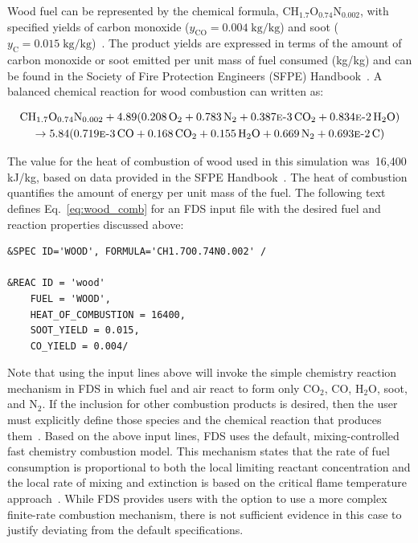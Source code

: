 \documentclass[12pt,oneside]{book}
\renewcommand{\C}{\mbox{C}}
\renewcommand{\H}{\mbox{H}}
\renewcommand{\O}{\mbox{O}}
\newcommand{\N}{\mbox{N}}
\begin{document}
Wood fuel can be represented by the chemical formula, $\C\H_{1.7}\O_{0.74}\N_{0.002}$, with specified yields of carbon monoxide ($y_{\mathrm{CO}}=0.004 \; \mathrm{kg}/\mathrm{kg}$) and soot ($y_{\mathrm{C}}=0.015 \; \mathrm{kg}/\mathrm{kg}$)~\cite{SFPE:Tewarson}. The product yields are expressed in terms of the amount of carbon monoxide or soot emitted per unit mass of fuel consumed (kg/kg) and can be found in the Society of Fire Protection Engineers (SFPE) Handbook~\cite{SFPE:Tewarson}. A balanced chemical reaction for wood combustion can written as:

\begin{multline}
\C\H_{1.7}\O_{0.74}\N_{0.002} + 4.89(0.208\,\O_{2} + 0.783\,\N_{2} + 0.387\text{\sc{e}-}3\,\C\O_{2} + 0.834\text{\sc{e}-}2\,\H_{2}\O) \\ 
\rightarrow 5.84(0.719\text{\sc{e}-}3\,\C\O + 0.168\,\C\O_{2} + 0.155\,\H_{2}\O + 0.669\,\N_{2} + 0.693\text{\sc{e}-}2\,\C)
\label{eq:wood_comb}
\end{multline}

The value for the heat of combustion of wood used in this simulation was~16,400 kJ/kg, based on data provided in the SFPE Handbook~\cite{SFPE:Tewarson}. The heat of combustion quantifies the amount of energy per unit mass of the fuel. The following text defines Eq.~\ref{eq:wood_comb} for an FDS input file with the desired fuel and reaction properties discussed above:

\begin{lstlisting}
&SPEC ID='WOOD', FORMULA='CH1.7O0.74N0.002' /

&REAC ID = 'wood' 
    FUEL = 'WOOD', 
    HEAT_OF_COMBUSTION = 16400,
    SOOT_YIELD = 0.015,
    CO_YIELD = 0.004/
\end{lstlisting}

Note that using the input lines above will invoke the simple chemistry reaction mechanism in FDS in which fuel and air react to form only CO$_2$, CO, H$_2$O, soot, and N$_2$. If the inclusion for other combustion products is desired, then the user must explicitly define those species and the chemical reaction that produces them~\cite{FDS_Users_Guide}. Based on the above input lines, FDS uses the default, mixing-controlled fast chemistry combustion model. This mechanism states that the rate of fuel consumption is proportional to both the local limiting reactant concentration and the local rate of mixing and extinction is based on the critical flame temperature approach~\cite{FDS_Math_Guide}. While FDS provides users with the option to use a more complex finite-rate combustion mechanism, there is not sufficient evidence in this case to justify deviating from the default specifications. 
\end{document}
